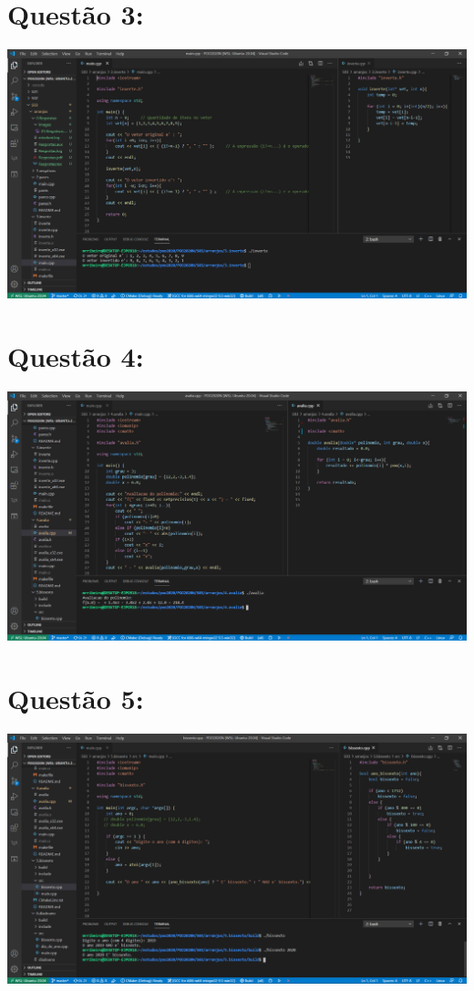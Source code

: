 \documentclass{article}
\begin{document}
\section*{Questão 3:}

\includegraphics[scale=0.4]{03.Inverte.png}
\vspace{15mm}


\section*{Questão 4:}

\includegraphics[scale=0.4]{04.Avalia.png}
\vspace{15mm}


\section*{Questão 5:}

\includegraphics[scale=0.4]{05.Bissexto.png}
\vspace{15mm}
\end{document}
